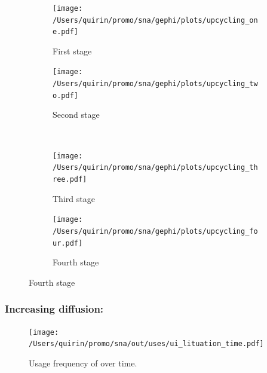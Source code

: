 \documentclass[
  a4paper,
  ]{scrartcl}
\begin{document}
    \subsubsection{}

      \begin{figure}[H]
        \caption{Social network of diffusion for  over time.}
        \centering
        \begin{subfigure}{.45\linewidth}
          \caption{First stage}
          \centering
          \texttt{[image: /Users/quirin/promo/sna/gephi/plots/upcycling\_one.pdf]}
        \end{subfigure}
        \begin{subfigure}{.45\linewidth}
          \caption{Second stage}
          \centering
          \texttt{[image: /Users/quirin/promo/sna/gephi/plots/upcycling\_two.pdf]}
        \end{subfigure}\\
        \begin{subfigure}{.45\linewidth}
          \caption{Third stage}
          \centering
          \texttt{[image: /Users/quirin/promo/sna/gephi/plots/upcycling\_three.pdf]}
        \end{subfigure}
        \begin{subfigure}{.45\linewidth}
          \caption{Fourth stage}
          \centering
          \texttt{[image: /Users/quirin/promo/sna/gephi/plots/upcycling\_four.pdf]}
        \end{subfigure}
      \end{figure}



    \subsubsection{Increasing diffusion: }

      \begin{figure}[H]
        \caption{Usage frequency of  over time.}
        \centering
        \texttt{[image: /Users/quirin/promo/sna/out/uses/ui\_lituation\_time.pdf]}
      \end{figure}
\end{document}
